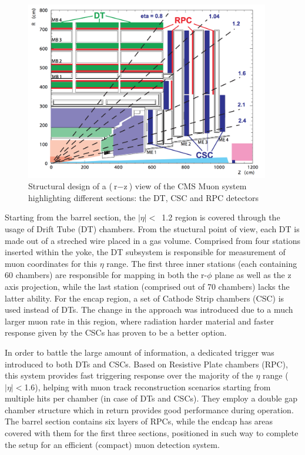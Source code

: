 \begin{figure}[htbp]
  \centering
    \includegraphics[width=0.95\textwidth]{CMS_experiment/Muon_chambers.png}
  \caption[Structural design of a ($\text{r}-\text{z}$) slice of the CMS Muon system highlighting different subsystems: the DT, CSC and RPC detectors.]{Structural design of a ($\text{r}-\text{z}$) view of the CMS Muon system highlighting different sections: the DT, CSC and RPC detectors~\cite{cms:tdr}}
  \label{fig:muon_chambers}
\end{figure}

\hspace{10pt} Starting from the barrel section, the $|\eta|<$~1.2 region is covered through the usage of Drift Tube (DT) chambers. From the stuctural point of view, each DT is made out of a streched wire placed in a gas volume. Comprised from four stations inserted within the yoke, the DT subsystem is responsible for measurement of muon coordinates for this $\eta$ range. The first three inner stations (each containing 60 chambers) are responsible for mapping in both the r-$\phi$ plane as well as the z axis projection, while the last station (comprised out of 70 chambers) lacks the latter ability. For the encap region, a set of Cathode Strip chambers (CSC) is used instead of DTs. The change in the approach was introduced due to a much larger muon rate in this region, where radiation harder material and faster response given by the CSCs has proven to be a better option. 

\hspace{10pt} In order to battle the large amount of information, a dedicated trigger was introduced to both DTs and CSCs. Based on Resistive Plate chambers (RPC), this system provides fast triggering response over the majority of the $\eta$ range ($|\eta|<$1.6), helping with muon track reconstruction scenarios starting from multiple hits per chamber (in case of DTs and CSCs). They employ a double gap chamber structure which in return provides good performance during operation. The barrel section contains six layers of RPCs, while the endcap has areas covered with them for the first three sections, positioned in such way to complete the setup for an efficient (compact) muon detection system. 








